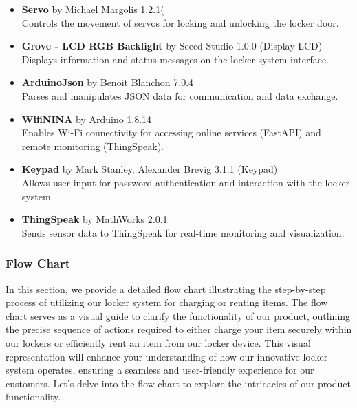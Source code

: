 \begin{itemize}
    \item \textbf{Servo} by Michael Margolis 1.2.1(\\ Controls the movement of servos for locking and unlocking the locker door.
    \item \textbf{Grove - LCD RGB Backlight} by Seeed Studio 1.0.0 (Display LCD) \\ Displays information and status messages on the locker system interface.
    \item \textbf{ArduinoJson} by Benoit Blanchon 7.0.4 \\ Parses and manipulates JSON data for communication and data exchange.
    \item \textbf{WifiNINA} by Arduino 1.8.14 \\ Enables Wi-Fi connectivity for accessing online services (FastAPI) and remote monitoring (ThingSpeak).
    \item \textbf{Keypad} by Mark Stanley, Alexander Brevig 3.1.1 (Keypad) \\ Allows user input for password authentication and interaction with the locker system.
    \item \textbf{ThingSpeak} by MathWorks 2.0.1 \\ Sends sensor data to ThingSpeak for real-time monitoring and visualization.
\end{itemize}
\newpage
\subsubsection{Flow Chart}
In this section, we provide a detailed flow chart illustrating the step-by-step process of utilizing our 
locker system for charging or renting items. The flow chart serves as a visual guide to clarify the 
functionality of our product, outlining the precise sequence of actions required to either charge your 
item securely within our lockers or efficiently rent an item from our locker device. 
This visual representation will enhance your understanding of how our innovative locker system operates,
ensuring a seamless and user-friendly experience for our customers. 
Let's delve into the flow chart to explore the intricacies of our product functionality.


